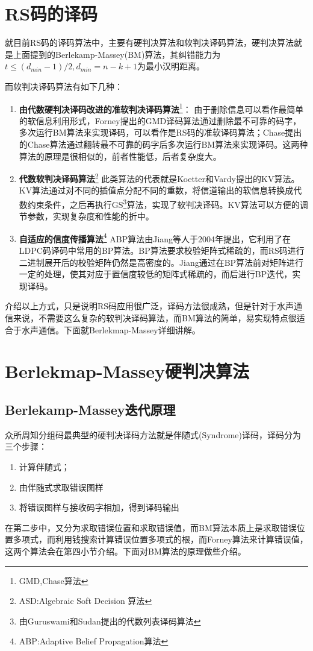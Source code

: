 \section{RS码的译码}
就目前RS码的译码算法中，主要有硬判决算法和软判决译码算法，硬判决算法就是上面提到的Berlekamp-Massey(BM)算法，其纠错能力为$t\le
(d_{min}-1)/2,d_{min}=n-k+1$为最小汉明距离。

而软判决译码算法有如下几种：
\begin{enumerate}
  \item \textbf{由代数硬判决译码改进的准软判决译码算法}\footnote{GMD,Chase算法}：
    \quad
    由于删除信息可以看作最简单的软信息利用形式，Forney提出的GMD译码算法通过删除最不可靠的码字，多次运行BM算法来实现译码，可以看作是RS码的准软译码算法；Chase提出的Chase算法通过翻转最不可靠的码字后多次运行BM算法来实现译码。这两种算法的原理是很相似的，前者性能低，后者复杂度大。
  \item \textbf{代数软判决译码算法}\footnote{ASD:Algebraic Soft Decision 算法}
    \quad
    此类算法的代表就是Koetter和Vardy提出的KV算法\cite{KV_RS}。KV算法通过对不同的插值点分配不同的重数，将信道输出的软信息转换成代数约束条件，之后再执行GS\footnote{由Guruswami和Sudan提出的代数列表译码算法}算法\cite{GS_RS}，实现了软判决译码。KV算法可以方便的调节参数，实现复杂度和性能的折中。
  \item \textbf{自适应的信度传播算法}\footnote{ABP:Adaptive Belief Propagation算法}
    \quad
    ABP算法由Jiang等人于2004年提出\cite{ABP_RS}，它利用了在LDPC码译码中常用的BP算法。BP算法要求校验矩阵式稀疏的，而RS码进行二进制展开后的校验矩阵仍然是高密度的。Jiang通过在BP算法前对矩阵进行一定的处理，使其对应于置信度较低的矩阵式稀疏的，而后进行BP迭代，实现译码。
\end{enumerate}

介绍以上方式，只是说明RS码应用很广泛，译码方法很成熟，但是针对于水声通信来说，不需要这么复杂的软判决译码算法，而BM算法的简单，易实现特点很适合于水声通信。下面就Berlekmap-Massey详细讲解。
\section{Berlekmap-Massey硬判决算法}
\subsection{Berlekamp-Massey迭代原理\cite{Jonathan_BCH}}
众所周知分组码最典型的硬判决译码方法就是伴随式(Syndrome)译码，译码分为三个步骤：
\begin{enumerate}
  \item 计算伴随式；
  \item 由伴随式求取错误图样
  \item 将错误图样与接收码字相加，得到译码输出
\end{enumerate}
在第二步中，又分为求取错误位置和求取错误值，而BM算法本质上是求取错误位置多项式，而利用钱搜索计算错误位置多项式的根，而Forney算法来计算错误值，这两个算法会在第四小节介绍。下面对BM算法的原理做些介绍\cite{ChenWenli_RS}。

